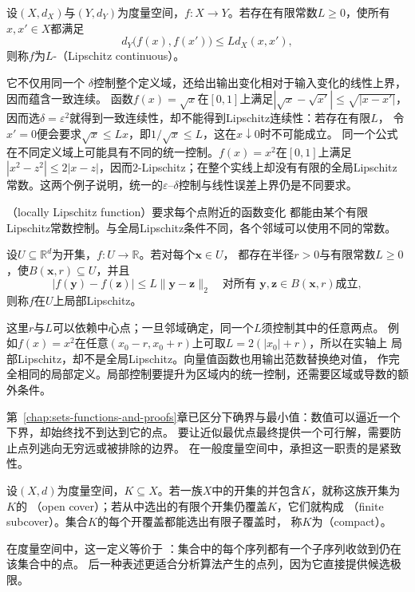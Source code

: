 \begin{definition}[Lipschitz连续映射]
\label{def:analysis-lipschitz-continuity}
设$(X,d_X)$与$(Y,d_Y)$为度量空间，$f:X\to Y$。若存在有限常数$L\geq0$，使所有$x,x'\in X$都满足
\begin{equation}
  d_Y\bigl(f(x),f(x')\bigr)\leq Ld_X(x,x'),
\label{eq:analysis-lipschitz-condition}
\end{equation}
则称$f$为$L$-（Lipschitz continuous）。
\end{definition}
它不仅用同一个
$\delta$控制整个定义域，还给出输出变化相对于输入变化的线性上界，因而蕴含一致连续。
函数$f(x)=\sqrt{x}$在$[0,1]$上满足$|\sqrt{x}-\sqrt{x'}|\leq\sqrt{|x-x'|}$，
因而选$\delta=\varepsilon^2$就得到一致连续性，却不能得到Lipschitz连续性：若存在有限$L$，
令$x'=0$便会要求$\sqrt{x}\leq Lx$，即$1/\sqrt{x}\leq L$，这在$x\downarrow0$时不可能成立。
同一个公式在不同定义域上可能具有不同的统一控制。$f(x)=x^2$在$[0,1]$上满足
$|x^2-z^2|\leq2|x-z|$，因而$2$-Lipschitz；在整个实线上却没有有限的全局Lipschitz
常数。这两个例子说明，统一的$\varepsilon$--$\delta$控制与线性误差上界仍是不同要求。

（locally Lipschitz function）要求每个点附近的函数变化
都能由某个有限Lipschitz常数控制。与全局Lipschitz条件不同，各个邻域可以使用不同的常数。
\begin{definition}[局部Lipschitz函数]
\label{def:analysis-local-lipschitz}
设$U\subseteq\mathbb{R}^d$为开集，$f:U\to\mathbb{R}$。若对每个$\bm{x}\in U$，
都存在半径$r>0$与有限常数$L\geq0$，使$B(\bm{x},r)\subseteq U$，并且
\[
  |f(\bm{y})-f(\bm{z})|
  \leq L\lVert\bm{y}-\bm{z}\rVert_2
  \quad\text{对所有 }\bm{y},\bm{z}\in B(\bm{x},r)\text{成立},
\]
则称$f$在$U$上局部Lipschitz。
\end{definition}

这里$r$与$L$可以依赖中心点；一旦邻域确定，同一个$L$须控制其中的任意两点。
例如$f(x)=x^2$在任意$(x_0-r,x_0+r)$上可取$L=2(|x_0|+r)$，所以在实轴上
局部Lipschitz，却不是全局Lipschitz。向量值函数也用输出范数替换绝对值，
作完全相同的局部定义。局部控制要提升为区域内的统一控制，还需要区域或导数的额外条件。


第~\ref{chap:sets-functions-and-proofs}章已区分下确界与最小值：数值可以逼近一个下界，却始终找不到达到它的点。
要让近似最优点最终提供一个可行解，需要防止点列逃向无穷远或被排除的边界。
在一般度量空间中，承担这一职责的是紧致性。
\begin{definition}[开覆盖与紧致性]
\label{def:analysis-compactness}
设$(X,d)$为度量空间，$K\subseteq X$。若一族$X$中的开集的并包含$K$，就称这族开集为$K$的
（open cover）；若从中选出的有限个开集仍覆盖$K$，它们就构成
（finite subcover）。集合$K$的每个开覆盖都能选出有限子覆盖时，
称$K$为（compact）。
\end{definition}
在度量空间中，这一定义等价于
：集合中的每个序列都有一个子序列收敛到仍在该集合中的点。
后一种表述更适合分析算法产生的点列，因为它直接提供候选极限。

